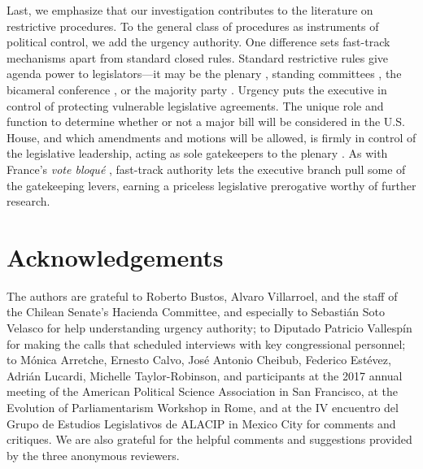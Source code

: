 \documentclass[letter,12pt]{article}
\begin{document}
Last, we emphasize that our investigation contributes to the literature on restrictive procedures. To the general class of procedures as instruments of political control, we add the urgency authority. One difference sets fast-track mechanisms apart from standard closed rules. Standard restrictive rules give agenda power to legislators---it may be the plenary \citep{mcnollgast.1987}, standing committees \citep{weingast.1992}, the bicameral conference \citep{shepsle.weingast.1987}, or the majority party \citep{cox.mccubbins.1997}. Urgency puts the executive in control of protecting vulnerable legislative agreements. The unique role and function to determine whether or not a major bill will be considered in the U.S. House, and which amendments and motions will be allowed, is firmly in control of the legislative leadership, acting as sole gatekeepers to the plenary \citep{cox.2006}. As with France's \emph{vote bloqué} \citep{huber.1996b}, fast-track authority lets the executive branch pull some of the gatekeeping levers, earning a priceless legislative prerogative worthy of further research.

\section*{Acknowledgements}
The authors are grateful to Roberto Bustos, Alvaro Villarroel, and the staff of the Chilean Senate’s Hacienda Committee, and especially to Sebastián Soto Velasco for help understanding urgency authority; to Diputado Patricio Vallespín for making the calls that scheduled interviews with key congressional personnel; to Mónica Arretche, Ernesto Calvo, José Antonio Cheibub, Federico Estévez, Adrián Lucardi, Michelle Taylor-Robinson, and participants at the 2017 annual meeting of the American Political Science Association in San Francisco, at the Evolution of Parliamentarism Workshop in Rome, and at the IV encuentro del Grupo de Estudios Legislativos de ALACIP in Mexico City for comments and critiques. We are also grateful for the helpful comments and suggestions provided by the three anonymous reviewers. 

\end{document}
